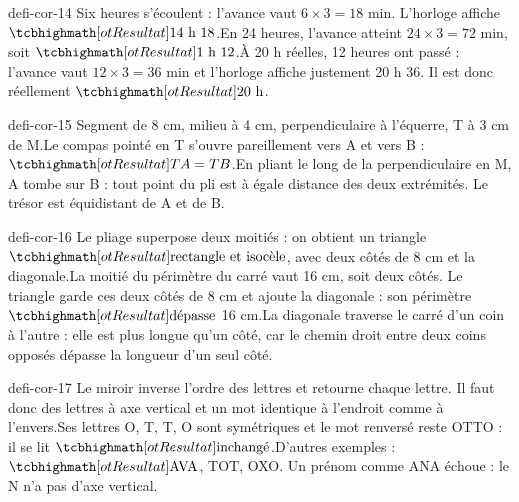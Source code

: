 \begin{blocEdition}{defi-cor-14}
Six heures s’écoulent : l’avance vaut $6\times3=18$ min. L’horloge affiche $\res{14\ \text h\ 18}$.En 24 heures, l’avance atteint $24\times3=72$ min, soit $\res{1\ \text h\ 12}$.À 20 h réelles, 12 heures ont passé : l’avance vaut $12\times3=36$ min et l’horloge affiche justement 20 h 36. Il est donc réellement $\res{20\ \text h}$.
\end{blocEdition}
\begin{blocEdition}{defi-cor-15}
Segment de 8 cm, milieu à 4 cm, perpendiculaire à l’équerre, T à 3 cm de M.Le compas pointé en T s’ouvre pareillement vers A et vers B : $\res{TA=TB}$.En pliant le long de la perpendiculaire en M, A tombe sur B : tout point du pli est à égale distance des deux extrémités. Le trésor est équidistant de A et de B.
\end{blocEdition}
\begin{blocEdition}{defi-cor-16}
Le pliage superpose deux moitiés : on obtient un triangle $\res{\text{rectangle et isocèle}}$, avec deux côtés de 8 cm et la diagonale.La moitié du périmètre du carré vaut 16 cm, soit deux côtés. Le triangle garde ces deux côtés de 8 cm et ajoute la diagonale : son périmètre $\res{\text{dépasse}}$ 16 cm.La diagonale traverse le carré d’un coin à l’autre : elle est plus longue qu’un côté, car le chemin droit entre deux coins opposés dépasse la longueur d’un seul côté.
\end{blocEdition}
\begin{blocEdition}{defi-cor-17}
Le miroir inverse l’ordre des lettres et retourne chaque lettre. Il faut donc des lettres à axe vertical et un mot identique à l’endroit comme à l’envers.Ses lettres O, T, T, O sont symétriques et le mot renversé reste OTTO : il se lit $\res{\text{inchangé}}$.D’autres exemples : $\res{\text{AVA}}$, TOT, OXO. Un prénom comme ANA échoue : le N n’a pas d’axe vertical.
\end{blocEdition}

